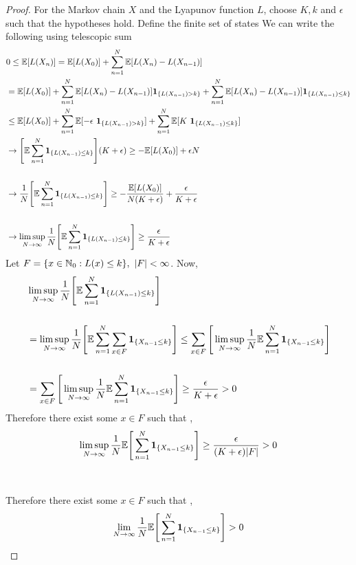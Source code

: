 \documentclass[a4paper,10pt,english]{article}
\begin{document}
\begin{proof}
For the Markov chain $X$ and the Lyapunov function $L$, choose $K,k$ and $\epsilon$ such that the hypotheses hold.  
Define the finite set of states  
We can write the following using telescopic sum
\begin{align*}
& 0 \leq \E[L(X_n)] = \E[L(X_0)] +   \sum_{n=1}^{N}\E[L(X_n)-L(X_{n-1})]\\
&= \E[L(X_0)] + \sum_{n=1}^{N}\E[L(X_n)-L(X_{n-1})]\boldsymbol{1}_{\{L(X_{n-1})>k\}} + \sum_{n=1}^{N}\E[L(X_n)-L(X_{n-1})]\boldsymbol{1}_{\{L(X_{n-1})\leq k\}}\\
&\leq \E[L(X_0)] + \sum_{n=1}^{N}\E[-\epsilon \        \boldsymbol{1}_{\{L(X_{n-1})>k\}}] + \sum_{n=1}^{N}\E[K \ \boldsymbol{1}_{\{L(X_{n-1})\leq k\}}]\\
&\to \Bigg[\E\sum_{n=1}^{N} \boldsymbol{1}_{\{L(X_{n-1})\leq k\}}\Bigg](K + \epsilon) \geq -\E[L(X_0)] + \epsilon N\\\\
&\to \frac{1}{N} \Bigg[\E\sum_{n=1}^{N} \boldsymbol{1}_{\{L(X_{n-1})\leq k\}}\Bigg] \geq -\frac{\E[L(X_0)]}{N(K+\epsilon)} + \frac{\epsilon}{K+\epsilon}\\\\
&\to \limsup_{N\to \infty}\frac{1}{N} \Bigg[\E\sum_{n=1}^{N} \boldsymbol{1}_{\{L(X_{n-1})\leq k\}}\Bigg] \geq \frac{\epsilon}{K+\epsilon}
\end{align*}
Let $F = \{x \in \mathbb{N}_0: L(x) \leq k\}, \ |F| < \infty$. Now,
\begin{align*}
& \limsup_{N\to \infty}\frac{1}{N} \Bigg[\mathbb{E}\sum_{n=1}^{N} \boldsymbol{1}_{\{L(X_{n-1})\leq k\}}\Bigg]\\\\
&=\limsup_{N\to \infty}\frac{1}{N} \Bigg[\mathbb{E}\sum_{n=1}^{N}\sum_{x \in F} \boldsymbol{1}_{\{X_{n-1}\leq k\}}\Bigg] \leq \sum_{x \in F} \Bigg[ \limsup_{N\to \infty}\frac{1}{N} \mathbb{E}\sum_{n=1}^{N} \boldsymbol{1}_{\{X_{n-1}\leq k\}}\Bigg]\\\\ 
&=\sum_{x \in F} \Bigg[ \limsup_{N\to \infty}\frac{1}{N} \mathbb{E}\sum_{n=1}^{N} \boldsymbol{1}_{\{X_{n-1}\leq k\}}\Bigg] \geq \frac{\epsilon}{K+\epsilon}>0
\end{align*}
Therefore there exist some $x \in F$ such that ,
\[\limsup_{N\to \infty}\frac{1}{N} \mathbb{E}\Bigg[ \sum_{n=1}^{N} \boldsymbol{1}_{\{X_{n-1}\leq k\}}\Bigg] \geq \frac{\epsilon}{(K+\epsilon)|F|}>0\]\\\\
Therefore there exist some $x \in F$ such that ,
\[\lim_{N\to \infty}\frac{1}{N} \mathbb{E}\Bigg[\sum_{n=1}^{N} \boldsymbol{1}_{\{X_{n-1}\leq k\}}\Bigg] >0\]
\end{proof}
\end{document}
